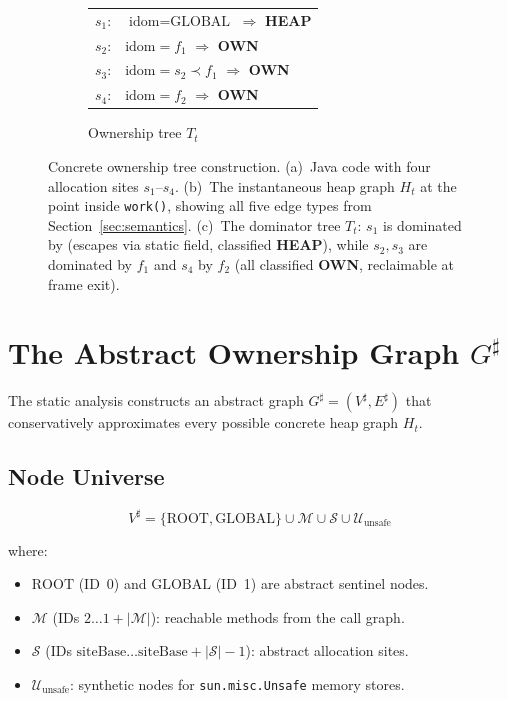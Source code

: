 \documentclass[12pt,a4paper]{article}
\newcommand{\OWN}{\textbf{OWN}}
\newcommand{\HEAP}{\textbf{HEAP}}
\newcommand{\GLOBAL}{\text{GLOBAL}}
\newcommand{\ROOT}{\text{ROOT}}
\newcommand{\idom}{\text{idom}}
\begin{document}
\begin{figure}[t]
\begin{subfigure}[t]{0.30\textwidth}
{\footnotesize
\begin{tabular}{@{}ll@{}}
$s_1$: & $\idom = \GLOBAL$ $\Rightarrow$ \HEAP{} \\
$s_2$: & $\idom = f_1$ $\Rightarrow$ \OWN{} \\
$s_3$: & $\idom = s_2 \prec f_1$ $\Rightarrow$ \OWN{} \\
$s_4$: & $\idom = f_2$ $\Rightarrow$ \OWN{}
\end{tabular}}
\caption{Ownership tree $T_t$}
\label{fig:ownership-tree}
\end{subfigure}
\caption{Concrete ownership tree construction. (a)~Java code with four allocation sites $s_1$--$s_4$. (b)~The instantaneous heap graph $H_t$ at the point inside \texttt{work()}, showing all five edge types from Section~\ref{sec:semantics}. (c)~The dominator tree $T_t$: $s_1$ is dominated by \GLOBAL{} (escapes via static field, classified \HEAP{}), while $s_2, s_3$ are dominated by $f_1$ and $s_4$ by $f_2$ (all classified \OWN{}, reclaimable at frame exit).}
\label{fig:ownership-example}
\end{figure}

\section{The Abstract Ownership Graph $G^\sharp$}
\label{sec:graph}

The static analysis constructs an abstract graph $G^\sharp = (V^\sharp, E^\sharp)$ that conservatively approximates every possible concrete heap graph $H_t$.

\subsection{Node Universe}

\[
V^\sharp = \{\ROOT, \GLOBAL\} \cup \mathcal{M} \cup \mathcal{S} \cup \mathcal{U}_{\text{unsafe}}
\]

where:
\begin{itemize}
  \item $\ROOT$ (ID~0) and $\GLOBAL$ (ID~1) are abstract sentinel nodes.
  \item $\mathcal{M}$ (IDs $2 \ldots 1 + |\mathcal{M}|$): reachable methods from the call graph.
  \item $\mathcal{S}$ (IDs $\text{siteBase} \ldots \text{siteBase} + |\mathcal{S}| - 1$): abstract allocation sites.
  \item $\mathcal{U}_{\text{unsafe}}$: synthetic nodes for \texttt{sun.misc.Unsafe} memory stores.
\end{itemize}
\end{document}
